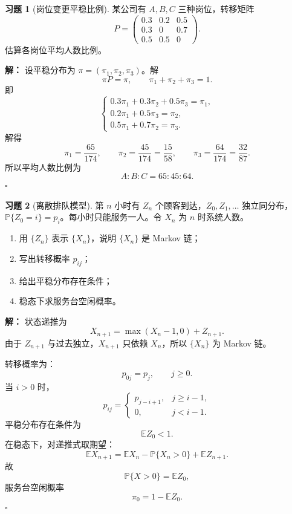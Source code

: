 \documentclass[12pt,a4paper,openany]{ctexrep}
\theoremstyle{definition}
\newtheorem{exercise}{习题}[section]
\newenvironment{solution}{\par\noindent\textbf{解：}}{\hfill$\square$\par}
\newcommand{\E}{\mathbb{E}}
\newcommand{\Pp}{\mathbb{P}}
\begin{document}
\begin{exercise}[岗位变更平稳比例]
某公司有 $A,B,C$ 三种岗位，转移矩阵
\[
P=
\begin{pmatrix}
0.3&0.2&0.5\\
0.3&0&0.7\\
0.5&0.5&0
\end{pmatrix}.
\]
估算各岗位平均人数比例。
\end{exercise}

\begin{solution}
设平稳分布为 $\pi=(\pi_1,\pi_2,\pi_3)$。解
\[
\pi P=\pi,\qquad \pi_1+\pi_2+\pi_3=1.
\]
即
\[
\begin{cases}
0.3\pi_1+0.3\pi_2+0.5\pi_3=\pi_1,\\
0.2\pi_1+0.5\pi_3=\pi_2,\\
0.5\pi_1+0.7\pi_2=\pi_3.
\end{cases}
\]
解得
\[
\pi_1=\frac{65}{174},\qquad
\pi_2=\frac{45}{174}=\frac{15}{58},\qquad
\pi_3=\frac{64}{174}=\frac{32}{87}.
\]
所以平均人数比例为
\[
A:B:C=65:45:64.
\]
\end{solution}

\begin{exercise}[离散排队模型]
第 $n$ 小时有 $Z_n$ 个顾客到达，$Z_0,Z_1,\dots$ 独立同分布，$\Pp\{Z_0=i\}=p_i$。每小时只能服务一人。令 $X_n$ 为 $n$ 时系统人数。
\begin{enumerate}[label=(\alph*)]
	\item 用 $\{Z_n\}$ 表示 $\{X_n\}$，说明 $\{X_n\}$ 是 Markov 链；
	\item 写出转移概率 $p_{ij}$；
	\item 给出平稳分布存在条件；
	\item 稳态下求服务台空闲概率。
\end{enumerate}
\end{exercise}

\begin{solution}
状态递推为
\[
X_{n+1}=\max(X_n-1,0)+Z_{n+1}.
\]
由于 $Z_{n+1}$ 与过去独立，$X_{n+1}$ 只依赖 $X_n$，所以 $\{X_n\}$ 为 Markov 链。

转移概率为：
\[
p_{0j}=p_j,\qquad j\ge0.
\]
当 $i>0$ 时，
\[
p_{ij}=
\begin{cases}
p_{j-i+1},&j\ge i-1,\\
0,&j<i-1.
\end{cases}
\]
平稳分布存在条件为
\[
\E Z_0<1.
\]
在稳态下，对递推式取期望：
\[
\E X_{n+1}=\E X_n-\Pp\{X_n>0\}+\E Z_{n+1}.
\]
故
\[
\Pp\{X>0\}=\E Z_0,
\]
服务台空闲概率
\[
\pi_0=1-\E Z_0.
\]
\end{solution}
\end{document}
